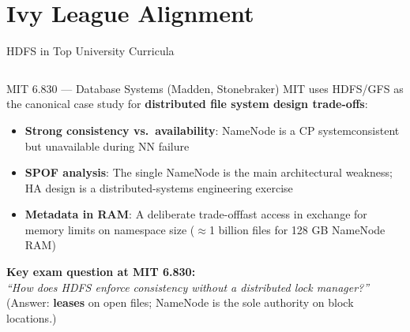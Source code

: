 \documentclass[aspectratio=169,10pt]{beamer}
\begin{document}
\section{Ivy League Alignment}

\begin{frame}{HDFS in Top University Curricula}
  \begin{columns}[T]
      \begin{block}{MIT 6.830 — Database Systems (Madden, Stonebraker)}
        \small MIT uses HDFS/GFS as the canonical case study for \textbf{distributed file system design trade-offs}:
        \begin{itemize}
          \item \textbf{Strong consistency vs.\ availability}: NameNode is a CP system\textemdash consistent but unavailable during NN failure
          \item \textbf{SPOF analysis}: The single NameNode is the main architectural weakness; HA design is a distributed-systems engineering exercise
          \item \textbf{Metadata in RAM}: A deliberate trade-off\textemdash fast access in exchange for memory limits on namespace size ($\approx$1 billion files for 128 GB NameNode RAM)
        \end{itemize}
        \vspace{4pt}
        \textbf{Key exam question at MIT 6.830:}\\
        \textit{``How does HDFS enforce consistency without a distributed lock manager?''} (Answer: \textbf{leases} on open files; NameNode is the sole authority on block locations.)
      \end{block}


\end{columns}
\end{frame}
\end{document}
